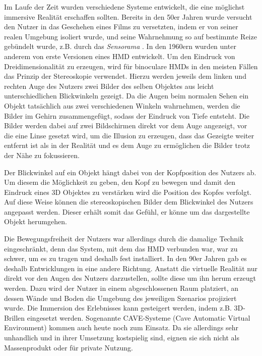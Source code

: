 Im Laufe der Zeit wurden verschiedene Systeme entwickelt, die eine möglichst immersive Realität erschaffen sollten. 
Bereits in den 50er Jahren wurde versucht den Nutzer in das Geschehen eines Films zu versetzten, indem er von seiner realen Umgebung isoliert wurde, und seine Wahrnehmung so auf bestimmte Reize gebündelt wurde, z.B. durch das \textit{Sensorama} \cite{sensorama}. %
In den 1960ern wurden unter anderem von \cite{Sutherland68} erste Versionen eines HMD entwickelt. %
Um den Eindruck von Dreidimensionalität zu erzeugen, wird für binoculare HMDs in den meisten Fällen das Prinzip der Stereoskopie verwendet. Hierzu werden jeweils dem linken und rechten Auge des Nutzers zwei Bilder des selben Objektes aus leicht unterschiedlichen Blickwinkeln  gezeigt. Da die Augen beim normalen Sehen ein Objekt tatsächlich aus zwei verschiedenen Winkeln wahrnehmen, werden die Bilder im Gehirn zusammengefügt, sodass der Eindruck von Tiefe entsteht. Die Bilder werden dabei auf zwei Bildschirmen direkt vor dem Auge angezeigt, vor die eine Linse gesetzt wird, um die Illusion zu erzeugen, dass das Gezeigte weiter entfernt ist als in der Realität und es dem Auge zu ermöglichen die Bilder trotz der Nähe zu fokussieren.

Der Blickwinkel auf ein Objekt hängt dabei von der Kopfposition des Nutzers ab. Um diesem die Möglichkeit zu geben, den Kopf zu bewegen und damit den Eindruck eines 3D Objektes zu verstärken wird die Position des Kopfes verfolgt. Auf diese Weise können die stereoskopischen Bilder dem Blickwinkel des Nutzers angepasst werden. Dieser erhält somit das Gefühl, er könne um das dargestellte Objekt herumgehen. 

Die Bewegungsfreiheit der Nutzers war allerdings durch die damalige Technik eingeschränkt, denn das System, mit dem das HMD verbunden war, war zu schwer, um es zu tragen und deshalb fest installiert. 
In den 90er Jahren gab es deshalb Entwicklungen in eine andere Richtung. Anstatt die virtuelle Realität nur direkt vor den Augen des Nutzers darzustellen, sollte diese um ihn herum erzeugt werden. Dazu wird der Nutzer in einem abgeschlossenen Raum platziert, an dessen Wände und Boden die Umgebung des jeweiligen Szenarios projiziert wurde. Die Immersion des Erlebnisses kann gesteigert werden, indem z.B. 3D-Brillen eingesetzt werden. Sogenannte CAVE-Systeme (Cave Automatic Virtual Environment) kommen auch heute noch zum Einsatz. Da sie allerdings sehr unhandlich und in ihrer Umsetzung kostspielig sind, eignen sie sich nicht als Massenprodukt oder für private Nutzung.

